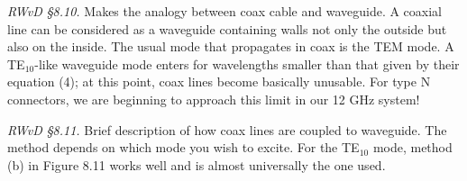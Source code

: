 \documentclass[12pt,preprint]{aastex}
\begin{document}
{\it RWvD \S 8.10.} Makes the analogy between coax cable and waveguide.
A coaxial line can be considered as a waveguide containing walls not
only the outside but also on the inside.  The usual mode that propagates
in coax is the TEM mode.  A TE$_{10}$-like waveguide mode enters for
wavelengths smaller than that given by their equation (4); at this
point, coax lines become basically unusable.  For type N connectors, we
are beginning to approach this limit in our 12 GHz system!

{\it RWvD \S 8.11.} Brief description of how coax lines are coupled to
waveguide. The method depends on which mode you wish to excite. For the
TE$_{10}$ mode, method (b) in Figure 8.11 works well and is almost
universally the one used.
\end{document}
